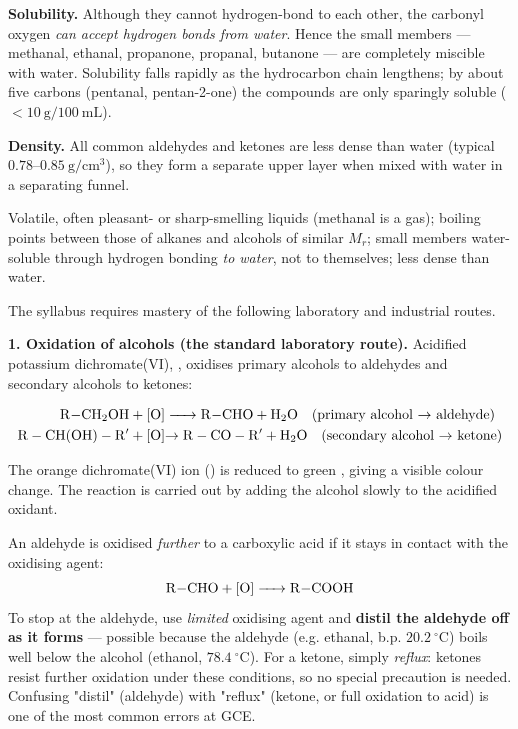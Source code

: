\documentclass[11pt]{article}
\newcounter{popsec}
\newcounter{popsub}
\newcommand{\courssub}[1]{%
  \stepcounter{popsub}%
  \par\vspace{9pt}\noindent{\popxbold\fontsize{11.5}{13}\selectfont\color{popink}{\color{poporange}\thepopsec.\thepopsub}\hspace{6pt}#1}\par\nopagebreak\vspace{4pt}
}
\begin{document}
\textbf{Solubility.} Although they cannot hydrogen-bond to each other, the carbonyl oxygen \emph{can accept hydrogen bonds from water}. Hence the small members — methanal, ethanal, propanone, propanal, butanone — are completely miscible with water. Solubility falls rapidly as the hydrocarbon chain lengthens; by about five carbons (pentanal, pentan-2-one) the compounds are only sparingly soluble ($< 10\ \mathrm{g/100\ mL}$).

\textbf{Density.} All common aldehydes and ketones are less dense than water (typical $0.78–0.85\ \mathrm{g/cm^3}$), so they form a separate upper layer when mixed with water in a separating funnel.

\begin{aretenir}
Volatile, often pleasant- or sharp-smelling liquids (methanal is a gas); boiling points between those of alkanes and alcohols of similar $M_r$; small members water-soluble through hydrogen bonding \emph{to water}, not to themselves; less dense than water.
\end{aretenir}

\courssub{Preparation of Aldehydes and Ketones}

The syllabus requires mastery of the following laboratory and industrial routes.

\textbf{1. Oxidation of alcohols (the standard laboratory route).} Acidified potassium dichromate(VI), , oxidises primary alcohols to aldehydes and secondary alcohols to ketones:

\begin{align*}
\ce{R-CH2OH + [O] &-> R-CHO + H2O} \quad \text{(primary alcohol $\to$ aldehyde)}\\
\ensuremath{\mathrm{R-CH(OH)-R^\prime + [O] }}&\ensuremath{\mathrm{\rightarrow  R-CO-R^\prime + H_{2}O}} \quad \text{(secondary alcohol $\to$ ketone)}
\end{align*}

The orange dichromate(VI) ion () is reduced to green , giving a visible colour change. The reaction is carried out by adding the alcohol slowly to the acidified oxidant.

\begin{attention}
An aldehyde is oxidised \emph{further} to a carboxylic acid if it stays in contact with the oxidising agent:
\[ \ce{R-CHO + [O] -> R-COOH} \]
To stop at the aldehyde, use \emph{limited} oxidising agent and \textbf{distil the aldehyde off as it forms} — possible because the aldehyde (e.g. ethanal, b.p. $20.2\ ^\circ$C) boils well below the alcohol (ethanol, $78.4\ ^\circ$C). For a ketone, simply \emph{reflux}: ketones resist further oxidation under these conditions, so no special precaution is needed. Confusing "distil" (aldehyde) with "reflux" (ketone, or full oxidation to acid) is one of the most common errors at GCE.
\end{attention}
\end{document}
